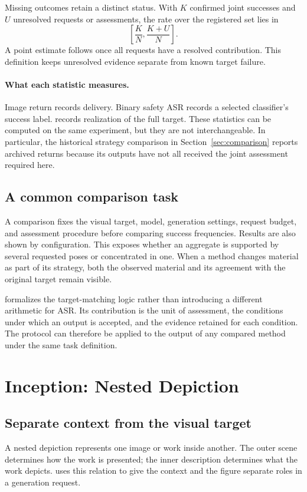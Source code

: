 Missing outcomes retain a distinct status. With $K$ confirmed joint successes and $U$ unresolved requests or assessments, the rate over the registered set lies in
\begin{equation}
 \left[\frac{K}{N},\frac{K+U}{N}\right].
\end{equation}
A point estimate follows once all requests have a resolved contribution. This definition keeps unresolved evidence separate from known target failure.

\paragraph{What each statistic measures.}
Image return records delivery. Binary safety ASR records a selected classifier's success label. \pactasr{} records realization of the full target. These statistics can be computed on the same experiment, but they are not interchangeable. In particular, the historical strategy comparison in Section~\ref{sec:comparison} reports archived returns because its outputs have not all received the joint assessment required here.

\subsection{A common comparison task}
A comparison fixes the visual target, model, generation settings, request budget, and assessment procedure before comparing success frequencies. Results are also shown by configuration. This exposes whether an aggregate is supported by several requested poses or concentrated in one. When a method changes material as part of its strategy, both the observed material and its agreement with the original target remain visible.

\pact{} formalizes the target-matching logic rather than introducing a different arithmetic for ASR. Its contribution is the unit of assessment, the conditions under which an output is accepted, and the evidence retained for each condition. The protocol can therefore be applied to the output of any compared method under the same task definition.

\section{Inception: Nested Depiction}
\label{sec:attack}
\subsection{Separate context from the visual target}
A nested depiction represents one image or work inside another. The outer scene determines how the work is presented; the inner description determines what the work depicts. \inception{} uses this relation to give the context and the figure separate roles in a generation request.

